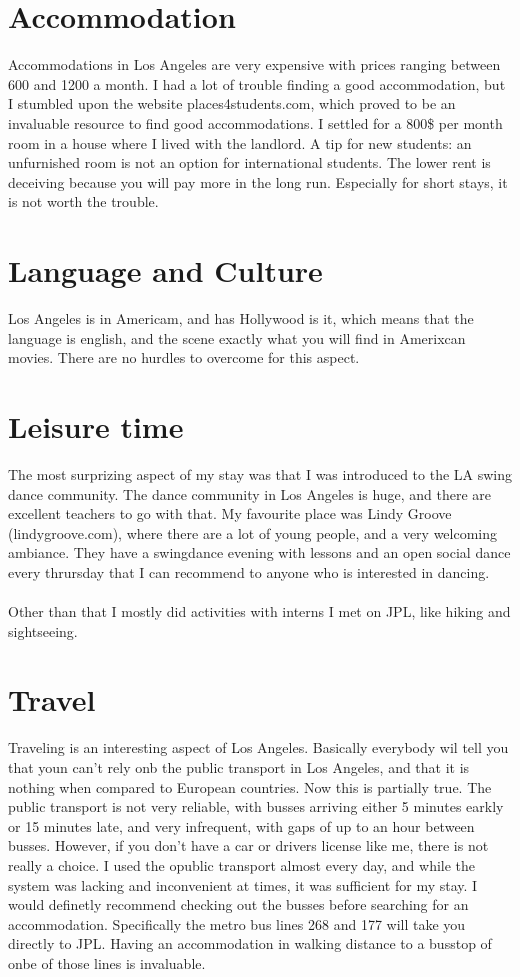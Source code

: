 \documentclass{article}
\begin{document}
\section{Accommodation}
Accommodations in Los Angeles are very expensive with prices ranging between 600 and 1200 a month. I had a lot of trouble finding a good accommodation, but I stumbled upon the website places4students.com, which proved to be an invaluable resource to find good accommodations. I settled for a 800\$ per month room in a house where I lived with the landlord. A tip for new students: an unfurnished room is not an option for international students. The lower rent is deceiving because you will pay more in the long run. Especially for short stays, it is not worth the trouble. 

\section{Language and Culture}
Los Angeles is in Americam, and has Hollywood is it, which means that the language is english, and the scene exactly what you will find in Amerixcan movies. There are no hurdles to overcome for this aspect.

\section{Leisure time}
The most surprizing aspect of my stay was that I was introduced to the LA swing dance community. The dance community in Los Angeles is huge, and there are excellent teachers to go with that. My favourite place was Lindy Groove (lindygroove.com), where there are a lot of young people, and a very welcoming ambiance. They have a swingdance evening with lessons and an open social dance every thrursday that I can recommend to anyone who is interested in dancing. \\
\\
Other than that I mostly did activities with interns I met on JPL, like hiking and sightseeing.

\section{Travel}
Traveling is an interesting aspect of Los Angeles. Basically everybody wil tell you that youn can't rely onb the public transport in Los Angeles, and that it is nothing when compared to European countries. Now this is partially true. The public transport is not very reliable, with busses arriving either 5 minutes earkly or 15 minutes late, and very infrequent, with gaps of up to an hour between busses. However, if you don't have a car or drivers license like me, there is not really a choice. I used the opublic transport almost every day, and while the system was lacking and inconvenient at times, it was sufficient for my stay. I would definetly recommend checking out the busses before searching for an accommodation. Specifically the metro bus lines 268 and 177 will take you directly to JPL. Having an accommodation in walking distance to a busstop of onbe of those lines is invaluable. 
\end{document}
